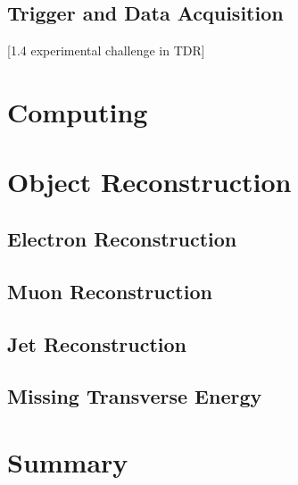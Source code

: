 \subsection{Trigger and Data Acquisition}
[1.4 experimental challenge in TDR]

\section{Computing}

\section{Object Reconstruction}

\subsection{Electron Reconstruction}

\subsection{Muon Reconstruction}

\subsection{Jet Reconstruction}

\subsection{Missing Transverse Energy}

\section{Summary}


